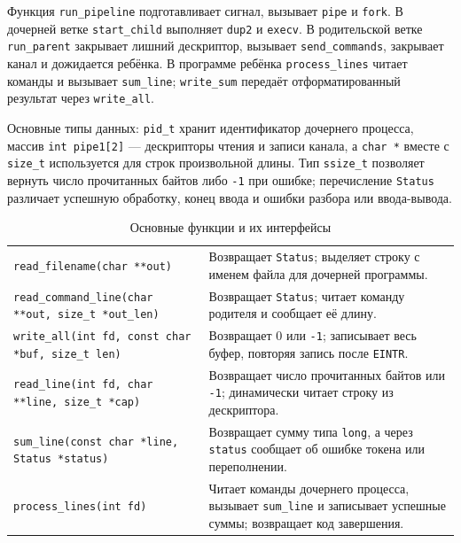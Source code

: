 \documentclass[12pt,a4paper]{article}
\begin{document}
Функция \texttt{run\_pipeline} подготавливает сигнал, вызывает \texttt{pipe} и \texttt{fork}. В дочерней ветке \texttt{start\_child} выполняет \texttt{dup2} и \texttt{execv}. В родительской ветке \texttt{run\_parent} закрывает лишний дескриптор, вызывает \texttt{send\_commands}, закрывает канал и дожидается ребёнка. В программе ребёнка \texttt{process\_lines} читает команды и вызывает \texttt{sum\_line}; \texttt{write\_sum} передаёт отформатированный результат через \texttt{write\_all}.

Основные типы данных: \texttt{pid\_t} хранит идентификатор дочернего процесса, массив \texttt{int pipe1[2]} — дескрипторы чтения и записи канала, а \texttt{char *} вместе с \texttt{size\_t} используется для строк произвольной длины. Тип \texttt{ssize\_t} позволяет вернуть число прочитанных байтов либо \texttt{-1} при ошибке; перечисление \texttt{Status} различает успешную обработку, конец ввода и ошибки разбора или ввода-вывода.

\begin{table}[H]
\caption{Основные функции и их интерфейсы}
\small
\begin{tabularx}{\linewidth}{|P{5.2cm}|L|}
\hline
{} & \tabularnewline \hline
\texttt{read\_filename(char **out)} & Возвращает \texttt{Status}; выделяет строку с именем файла для дочерней программы. \\ \hline
\texttt{read\_command\_line(char **out, size\_t *out\_len)} & Возвращает \texttt{Status}; читает команду родителя и сообщает её длину. \\ \hline
\texttt{write\_all(int fd, const char *buf, size\_t len)} & Возвращает 0 или \texttt{-1}; записывает весь буфер, повторяя запись после \texttt{EINTR}. \\ \hline
\texttt{read\_line(int fd, char **line, size\_t *cap)} & Возвращает число прочитанных байтов или \texttt{-1}; динамически читает строку из дескриптора. \\ \hline
\texttt{sum\_line(const char *line, Status *status)} & Возвращает сумму типа \texttt{long}, а через \texttt{status} сообщает об ошибке токена или переполнении. \\ \hline
\texttt{process\_lines(int fd)} & Читает команды дочернего процесса, вызывает \texttt{sum\_line} и записывает успешные суммы; возвращает код завершения. \\ \hline
\end{tabularx}
\end{table}
\end{document}

